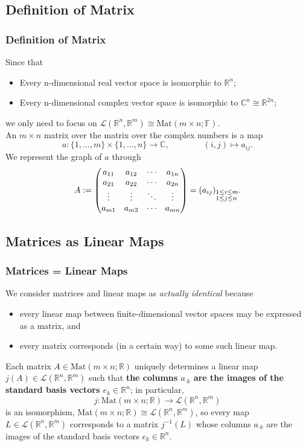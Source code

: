 \documentclass[12pt, t]{beamer}
\renewcommand{\emph}[1]{{\color{Turquoise3}\textsl{#1}}}
\newcommand{\C}{\mathbb{C}} \newcommand{\F}{\mathbb{F}} \newcommand{\R}{\mathbb{R}} \newcommand{\Q}{\mathbb{Q}}
\begin{document}
\subsection{Definition of Matrix}
\begin{frame}
    \frametitle{Definition of Matrix}
    Since that
    \begin{itemize}
        \item Every n-dimensional real vector space is isomorphic to $\R^n$;
        \item Every n-dimensional complex vector space is isomorphic to $\C^n\cong  \R^{2n}$;
    \end{itemize}
    we only need to focus on $\mathcal{L}(\R^n,\R^m)\cong \text{Mat}(m\times n;\F)$.\\
    An $m\times n$ matrix over the matrix over the complex numbers is a map
    \[a:\{1,\ldots,m\}\times\{1,\ldots,n\}\to\C,\qquad\qquad(i,j)\mapsto a_{ij}.\]
    We represent the graph of $a$ through
    \begin{equation*}
        A:=\begin{pmatrix}
            a_{11} & a_{12} & \cdots & a_{1n} \\
            a_{21} & a_{22} & \cdots & a_{2n} \\
            \vdots & \vdots & \ddots & \vdots \\
            a_{m1} & a_{m2} & \cdots & a_{mn}
        \end{pmatrix}=(a_{ij})_{\begin{subarray}~1\leq i\leq m\\ 1\leq j\leq n\end{subarray}}.
    \end{equation*}
\end{frame}

\subsection{Matrices as Linear Maps}
\begin{frame}
    \frametitle{\textbf{Matrices = Linear Maps}}
    We consider matrices and linear maps as \emph{actually identical} because
    \begin{itemize}
        \item every linear map between finite-dimensional vector spaces may be expressed as a matrix, and
        \item every matrix corresponds (in a certain way) to some such linear map.
    \end{itemize}
    Each matrix $A\in\text{Mat}(m\times n;\R)$ uniquely determines a linear map $j(A)\in\mathcal{L}(\R^n,\R^m)$ such that \textbf{the columns $a_{\cdot k}$ are the images of the standard basis vectors $e_k\in\R^n$}; in particular,
    \[j:\text{Mat}(m\times n;\R)\to\mathcal{L}(\R^n,\R^m)\]
    is an isomorphism, Mat$(m\times n;\R)\cong\mathcal{L}(\R^n,\R^m)$, so every map $L\in\mathcal{L}(\R^n,\R^m)$ corresponds to a matrix $j^{-1}(L)$ whose columns $a_{\cdot k}$ are the images of the standard basis vectors $e_k\in\R^n$.
\end{frame}
\end{document}
